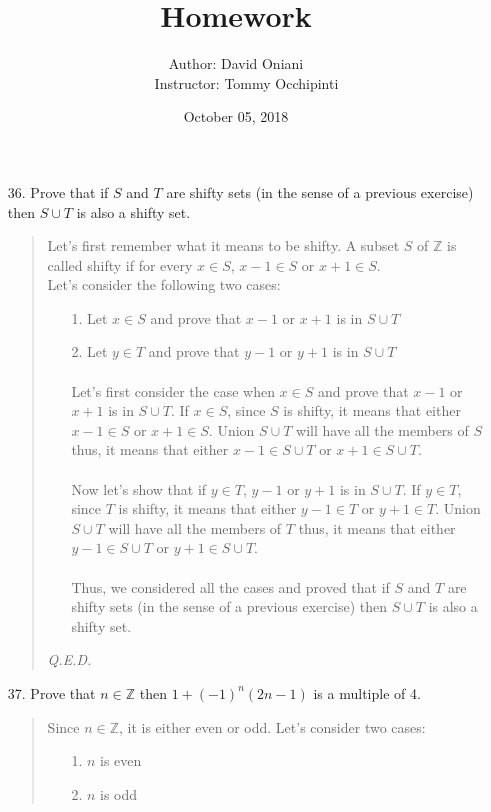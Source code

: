 \documentclass[12pt, a4paper]{article}                      %
\title{\bf{Homework \textnumero 6}}
\author{Author: David Oniani
\\
\ \ \ Instructor: Tommy Occhipinti}
\date{October 05, 2018}
\newcommand{\intz}{\mathbb{Z}}
\begin{document}
\maketitle


\begin{itemize}
\item[36.]
Prove that if $S$ and $T$ are shifty sets (in the sense of a previous exercise) then $S \cup T$
is also a shifty set.
\begin{quote}
Let's first remember what it means to be shifty.
A subset $S$ of $\intz$ is called shifty if for every $x \in S$, $x - 1 \in S$ or $x + 1 \in S$.\\
Let's consider the following two cases:
\begin{itemize}
\item[1.]
Let $x \in S$ and prove that $x - 1$ or $x + 1$ is in $S \cup T$
\item[2.]
Let $y \in T$ and prove that $y - 1$ or $y + 1$ is in $S \cup T$
\\\\
Let's first consider the case when $x \in S$ and prove that $x - 1$ or $x + 1$ is in $S \cup T$.
If $x \in S$, since $S$ is shifty, it means that either $x - 1 \in S$ or $x + 1 \in S$. Union $S \cup T$
will have all the members of $S$ thus, it means that either $x - 1 \in S \cup T$ or $x + 1 \in S \cup T$.
\\\\
Now let's show that if $y \in T$, $y - 1$ or $y + 1$ is in $S \cup T$.
If $y \in T$, since $T$ is shifty, it means that either $y - 1 \in T$ or $y + 1 \in T$. Union $S \cup T$
will have all the members of $T$ thus, it means that either $y - 1 \in S \cup T$ or $y + 1 \in S \cup T$.
\\\\
Thus, we considered all the cases and proved that if $S$ and $T$ are shifty sets (in the sense of a previous exercise) then $S \cup T$
is also a shifty set.
\end{itemize}
\begin{flushright}
\textit{Q.E.D.}
\end{flushright}
\end{quote}

\item[37.]
Prove that $n \in \intz$ then $1 + (-1)^n(2n-1)$ is a multiple of 4.
\begin{quote}
Since $n \in \intz$, it is either even or odd. Let's consider two cases:
\begin{itemize}
\item[1.]
$n$ is even
\item[2.]
$n$ is odd
\end{itemize}


\end{quote}
\end{itemize}
\end{document}
